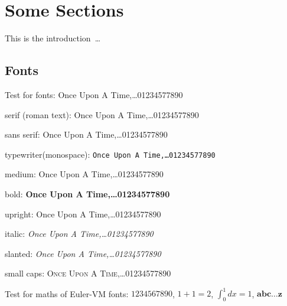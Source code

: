 \section{Some Sections}
\label{sec:sections}
This is the introduction~\cite{scipaper1, latex}\ldots
\vspace{1em}

\subsection{Fonts}

Test for fonts: Once Upon A Time,\ldots 01234577890
\vspace{1em}

serif (roman text): 
\textrm{Once Upon A Time,\ldots 01234577890} %
\vspace{1em}

sans serif: 
\textsf{Once Upon A Time,\ldots 01234577890} %
\vspace{1em}

typewriter(monospace): 
\texttt{Once Upon A Time,\ldots 01234577890} %
\vspace{1em}

medium: 
\textmd{Once Upon A Time,\ldots 01234577890} %
\vspace{1em}

bold:
\textbf{Once Upon A Time,\ldots 01234577890} %
\vspace{1em}

upright:
\textup{Once Upon A Time,\ldots 01234577890} %
\vspace{1em}

italic:
\textit{Once Upon A Time,\ldots 01234577890} %
\vspace{1em}

slanted:
\textsl{Once Upon A Time,\ldots 01234577890} %
\vspace{1em}

small caps:
\textsc{Once Upon A Time,\ldots 01234577890} %
\vspace{2em}

Test for maths of Euler-VM fonts:
$1234567890$, $1+1=2$,  $\int_0^1 dx = 1$, $\mathbold{abc\ldots z}$


